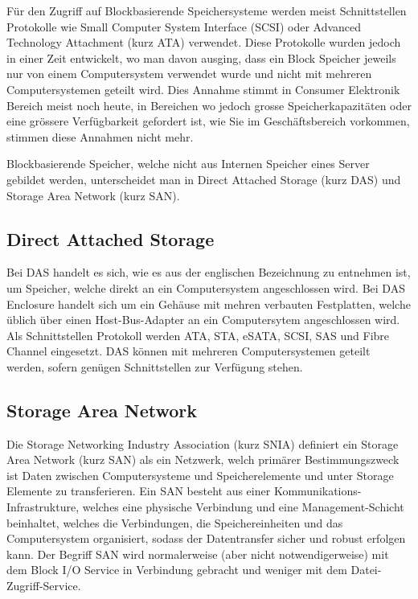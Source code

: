 Für den Zugriff auf Blockbasierende Speichersysteme werden meist Schnittstellen Protokolle wie Small Computer System Interface (SCSI) oder Advanced Technology Attachment (kurz \gls{ATA}) verwendet. Diese Protokolle wurden jedoch in einer Zeit entwickelt, wo man davon ausging, dass ein Block Speicher jeweils nur von einem Computersystem verwendet wurde und nicht mit mehreren Computersystemen geteilt wird. Dies Annahme stimmt in Consumer Elektronik Bereich meist noch heute, in Bereichen wo jedoch grosse Speicherkapazitäten oder eine grössere Verfügbarkeit gefordert ist, wie Sie im Geschäftsbereich vorkommen, stimmen diese Annahmen nicht mehr.

Blockbasierende Speicher, welche nicht aus Internen Speicher eines Server gebildet werden, unterscheidet man in Direct Attached Storage (kurz DAS) und Storage Area Network (kurz SAN). 

\subsection{Direct Attached Storage}
Bei DAS handelt es sich, wie es aus der englischen Bezeichnung zu entnehmen ist, um Speicher, welche direkt an ein Computersystem angeschlossen wird. Bei DAS Enclosure handelt sich um ein Gehäuse mit mehren verbauten Festplatten, welche üblich über einen Host-Bus-Adapter an ein Computersytem angeschlossen wird. Als Schnittstellen Protokoll werden \gls{ATA}, \gls{STA}, \gls{eSATA}, \gls{SCSI}, \gls{SAS} und Fibre Channel eingesetzt. DAS können mit mehreren Computersystemen geteilt werden, sofern genügen Schnittstellen zur Verfügung stehen.

\subsection{Storage Area Network}
Die Storage Networking Industry Association (kurz \gls{SNIA}) definiert ein Storage Area Network (kurz SAN) als ein Netzwerk, welch primärer Bestimmungszweck ist Daten zwischen Computersysteme und Speicherelemente und unter Storage Elemente zu transferieren. Ein SAN besteht aus einer Kommunikations-Infrastrukture, welches eine physische Verbindung und eine Management-Schicht beinhaltet, welches die Verbindungen, die Speichereinheiten und das Computersystem organisiert, sodass der Datentransfer sicher und robust erfolgen kann. Der Begriff SAN wird normalerweise (aber nicht notwendigerweise) mit dem Block I/O Service in Verbindung gebracht und weniger mit dem Datei-Zugriff-Service.\cite{SNIA2011}

